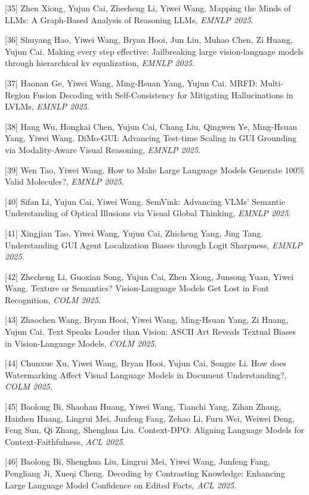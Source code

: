 [35] Zhen Xiong, Yujun Cai, Zhecheng Li, Yiwei Wang. Mapping the Minds of LLMs: A Graph-Based Analysis of Reasoning LLMs, \textit{EMNLP 2025}.

[36] Shuyang Hao, Yiwei Wang, Bryan Hooi, Jun Liu, Muhao Chen, Zi Huang, Yujun Cai. Making every step effective: Jailbreaking large vision-language models through hierarchical kv equalization, \textit{EMNLP 2025}.

[37] Haonan Ge, Yiwei Wang, Ming-Hsuan Yang, Yujun Cai. MRFD: Multi-Region Fusion Decoding with Self-Consistency for Mitigating Hallucinations in LVLMs, \textit{EMNLP 2025}.

[38] Hang Wu, Hongkai Chen, Yujun Cai, Chang Liu, Qingwen Ye, Ming-Hsuan Yang, Yiwei Wang. DiMo-GUI: Advancing Test-time Scaling in GUI Grounding via Modality-Aware Visual Reasoning, \textit{EMNLP 2025}.

[39] Wen Tao, Yiwei Wang. How to Make Large Language Models Generate 100\% Valid Molecules?, \textit{EMNLP 2025}.

[40] Sifan Li, Yujun Cai, Yiwei Wang. SemVink: Advancing VLMs' Semantic Understanding of Optical Illusions via Visual Global Thinking, \textit{EMNLP 2025}.

[41] Xingjian Tao, Yiwei Wang, Yujun Cai, Zhicheng Yang, Jing Tang. Understanding GUI Agent Localization Biases through Logit Sharpness, \textit{EMNLP 2025}.

[42] Zhecheng Li, Guoxian Song, Yujun Cai, Zhen Xiong, Junsong Yuan, Yiwei Wang. Texture or Semantics? Vision-Language Models Get Lost in Font Recognition, \textit{COLM 2025}.

[43] Zhaochen Wang, Bryan Hooi, Yiwei Wang, Ming-Hsuan Yang, Zi Huang, Yujun Cai. Text Speaks Louder than Vision: ASCII Art Reveals Textual Biases in Vision-Language Models, \textit{COLM 2025}.

[44] Chunxue Xu, Yiwei Wang, Bryan Hooi, Yujun Cai, Songze Li. How does Watermarking Affect Visual Language Models in Document Understanding?, \textit{COLM 2025}.

[45] Baolong Bi, Shaohan Huang, Yiwei Wang, Tianchi Yang, Zihan Zhang, Haizhen Huang, Lingrui Mei, Junfeng Fang, Zehao Li, Furu Wei, Weiwei Deng, Feng Sun, Qi Zhang, Shenghua Liu. Context-DPO: Aligning Language Models for Context-Faithfulness, \textit{ACL 2025}.

[46] Baolong Bi, Shenghua Liu, Lingrui Mei, Yiwei Wang, Junfeng Fang, Pengliang Ji, Xueqi Cheng. Decoding by Contrasting Knowledge: Enhancing Large Language Model Confidence on Edited Facts, \textit{ACL 2025}.

